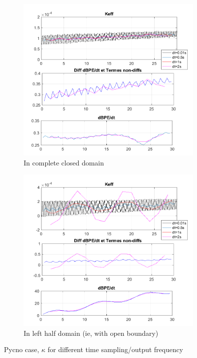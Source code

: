 \begin{figure}
\begin{subfigure}{.5\textwidth}
\includegraphics[width=1\textwidth]{./CHAP_BPE/figcompKAPPA_dt-out_psinAll.png}
\caption{In complete closed domain}
\end{subfigure}
\begin{subfigure}{.5\textwidth}
\includegraphics[width=1\textwidth]{./CHAP_BPE/figcompKAPPA_dt-out_psinL.png}
\caption{In left half domain (ie, with open boundary)}
\end{subfigure}
\caption{Pycno case, $\kappa$ for different time sampling/output frequency}
\end{figure}

